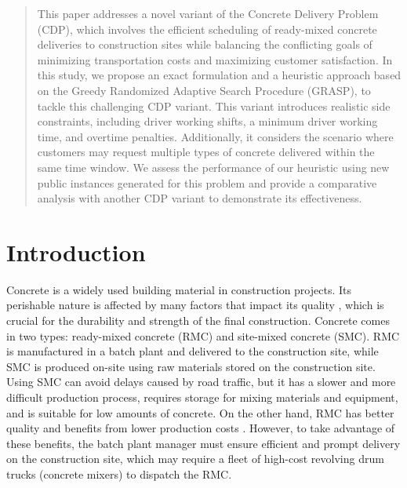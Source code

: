 \begin{abstract}
    This paper addresses a novel variant of the Concrete Delivery Problem (CDP), which involves the efficient scheduling of ready-mixed concrete deliveries to construction sites while balancing the conflicting goals of minimizing transportation costs and maximizing customer satisfaction. In this study, we propose an exact formulation and a heuristic approach based on the Greedy Randomized Adaptive Search Procedure (GRASP), to tackle this challenging CDP variant. This variant introduces realistic side constraints, including driver working shifts, a minimum driver working time, and overtime penalties. Additionally, it considers the scenario where customers may request multiple types of concrete delivered within the same time window. We assess the performance of our heuristic using new public instances generated for this problem and provide a comparative analysis with another CDP variant to demonstrate its effectiveness.
\end{abstract}




\section{Introduction}
\label{sec:cdp_intro}
Concrete is a widely used building material in construction projects. Its perishable nature is affected by many factors that impact its quality \citep{sinha_quality_2021}, which is crucial for the durability and strength of the final construction. Concrete comes in two types: ready-mixed concrete (RMC) and site-mixed concrete (SMC). RMC is manufactured in a batch plant and delivered to the construction site, while SMC is produced on-site using raw materials stored on the construction site. Using SMC can avoid delays caused by road traffic, but it has a slower and more difficult production process, requires storage for mixing materials and equipment, and is suitable for low amounts of concrete. On the other hand, RMC has better quality and benefits from lower production costs \citep{muresan_comparing}. However, to take advantage of these benefits, the batch plant manager must ensure efficient and prompt delivery on the construction site, which may require a fleet of high-cost revolving drum trucks (concrete mixers) to dispatch the RMC.

